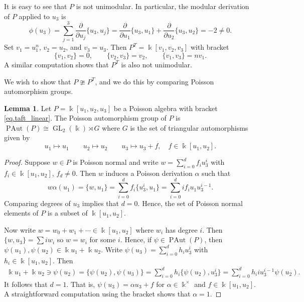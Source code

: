 \documentclass[reqno]{amsart}
\numberwithin{equation}{section}
\theoremstyle{definition}
\newtheorem{lemma}[theorem]{Lemma}
\DeclareMathOperator\GL{GL}
\DeclareMathOperator\PAut{PAut}
\newcommand\niso{\ncong}
\newcommand\iso{\cong}
\newcommand\kk{\Bbbk}
\begin{document}
It is easy to see that $P$ is not unimodular. In particular, the modular derivation of $P$ applied to $u_3$ is
\[
\phi(u_3) = \sum_{j=1}^3 \frac{\partial}{\partial u_j} \{u_3,u_j\}
    = \frac{\partial}{\partial u_1} \{u_3,u_1\} + \frac{\partial}{\partial u_2} \{u_3,u_2\} = -2 \neq 0.
\]
Set $v_1=u_1^n$, $v_2 = u_2$, and $v_3 = u_3$. Then $P^T = \kk[v_1,v_2,v_3]$ with bracket 
\[ 
    \{ v_1,v_2 \} = 0, \qquad 
    \{ v_2, v_3 \} = v_2, \qquad 
    \{ v_1,v_3 \} = n v_1.
\]
A similar computation shows that $P^T$ is also not unimodular.

We wish to show that $P \niso P^T$, and we do this by comparing Poisson automorphism groups.

\begin{lemma}\label{lem.taft_linear1}
Let $P=\kk[u_1,u_2,u_3]$ be a Poisson algebra with bracket \eqref{eq.taft_linear}. The Poisson automorphism group of $P$ is $\PAut(P) \iso \GL_2(\kk) \rtimes G$ where $G$ is the set of triangular automorphisms given by
    \[  u_1 \mapsto u_1 \qquad 
    u_2 \mapsto u_2 \qquad 
    u_3 \mapsto u_3 + f, \quad f \in \kk[u_1,u_2]. 
    \]
\end{lemma}
\begin{proof}
Suppose $w \in P$ is Poisson normal and write
$w = \sum_{i=0}^d f_i u_3^i$ with $f_i \in \kk[u_1,u_2]$, $f_d \neq 0$. Then $w$ induces a Poisson derivation $\alpha$ such that
\[ w\alpha(u_1) = \{w,u_1\} = \sum_{i=0}^d f_i \{u_3^i,u_1\}
    = \sum_{i=0}^d i f_i u_1 u_3^{i-1}.
\]
Comparing degrees of $u_3$ implies that $d=0$. Hence, the set of Poisson normal elements of $P$ is a subset of $\kk[u_1,u_2]$.

Now write $w = w_0 + w_1 + \cdots \in \kk[u_1,u_2]$ where $w_i$ has degree $i$. Then $\{ w, u_3 \} = \sum i w_i$ so $w=w_i$ for some $i$. Hence, if $\psi \in \PAut(P)$, then $\psi(u_1), \psi(u_2) \in \kk u_1 + \kk u_2$. Write $\psi(u_3) = \sum_{i=0}^d h_i u_3^i$ with $h_i \in \kk[u_1,u_2]$. Then 
\begin{align}\label{eq.linear_aut} 
\kk u_1 + \kk u_2 \ni \psi(u_2) = \{ \psi(u_2),\psi(u_3) \}
    = \sum_{i=0}^d h_i \{ \psi(u_2),u_3^i \}
    = \sum_{i=0}^d h_i i u_3^{i-1} \psi(u_2).
\end{align}
It follows that $d=1$. That is, $\psi(u_3)=\alpha u_3 + f$ for $\alpha \in \kk^\times$ and $f \in \kk[u_1,u_2]$. A straightforward computation using the bracket shows that $\alpha=1$.
\end{proof}
\end{document}
